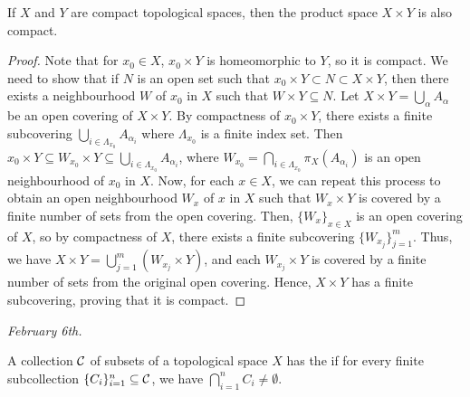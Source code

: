 \begin{theorem}
    If $X$ and $Y$ are compact topological spaces, then the product space $X \times Y$ is also compact.
\end{theorem}
\begin{proof}
    Note that for $x_{0} \in X$, $x_{0} \times Y$ is homeomorphic to $Y$, so it is compact. We need to show that if $N$ is an open set such that $x_{0} \times Y \subset N \subset X \times Y$, then there exists a neighbourhood $W$ of $x_{0}$ in $X$ such that $W \times Y \subseteq N$. Let $X \times Y = \bigcup_{\alpha} A_{\alpha}$ be an open covering of $X \times Y$. By compactness of $x_{0} \times Y$, there exists a finite subcovering $\bigcup_{i \in \Lambda_{x_{0}}} A_{\alpha_{i}}$ where $\Lambda_{x_{0}}$ is a finite index set. Then $x_{0} \times Y \subseteq W_{x_{0}} \times Y \subseteq \bigcup_{i \in \Lambda_{x_{0}}} A_{\alpha_{i}}$, where $W_{x_{0}} = \bigcap_{i \in \Lambda_{x_{0}}} \pi_{X}(A_{\alpha_{i}})$ is an open neighbourhood of $x_{0}$ in $X$. Now, for each $x \in X$, we can repeat this process to obtain an open neighbourhood $W_{x}$ of $x$ in $X$ such that $W_{x} \times Y$ is covered by a finite number of sets from the open covering. Then, $\{W_{x}\}_{x \in X}$ is an open covering of $X$, so by compactness of $X$, there exists a finite subcovering $\{W_{x_{j}}\}_{j=1}^{m}$. Thus, we have $X \times Y = \bigcup_{j=1}^{m} (W_{x_{j}} \times Y)$, and each $W_{x_{j}} \times Y$ is covered by a finite number of sets from the original open covering. Hence, $X \times Y$ has a finite subcovering, proving that it is compact.
\end{proof}


\textit{February 6th.}

\begin{definition}
    A collection $\mathcal{C}$ of subsets of a topological space $X$ has the  if for every finite subcollection $\{C_{i}\}_{i=1}^{n} \subseteq \mathcal{C}$, we have $\bigcap_{i=1}^{n} C_{i} \neq \emptyset$.
\end{definition}

